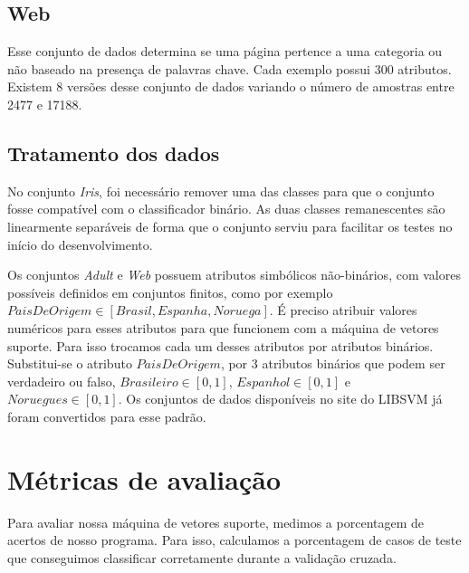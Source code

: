 \subsection{Web} \label{sec:Web}
Esse conjunto de dados determina se uma página pertence a uma categoria ou não baseado na presença de palavras chave. Cada exemplo possui 300 atributos. Existem 8 versões desse conjunto de dados variando o número de amostras entre 2477 e 17188.

\subsection{Tratamento dos dados}
No conjunto {\em Iris}, foi necessário remover uma das classes para que o conjunto fosse compatível com o classificador binário. As duas classes remanescentes são linearmente separáveis de forma que o conjunto serviu para facilitar os testes no início do desenvolvimento.

Os conjuntos \emph{Adult} e \emph{Web} possuem atributos simbólicos não-binários, com valores possíveis definidos em conjuntos finitos, como por exemplo $PaisDeOrigem \in \left [ Brasil,Espanha,Noruega \right ]$. É preciso atribuir valores numéricos para esses atributos para que funcionem com a máquina de vetores suporte. Para isso trocamos cada um desses atributos por atributos binários. Substitui-se o atributo $PaisDeOrigem$, por 3 atributos binários que podem ser verdadeiro ou falso, $Brasileiro \in \left [ 0,1 \right ]$, $Espanhol \in \left [ 0,1 \right ]$ e $Noruegues \in \left [ 0,1 \right ]$. Os conjuntos de dados disponíveis no site do LIBSVM já foram convertidos para esse padrão.

\section{Métricas de avaliação}
Para avaliar nossa máquina de vetores suporte, medimos a porcentagem de acertos de nosso programa. Para isso, calculamos a porcentagem de casos de teste que conseguimos classificar corretamente durante a validação cruzada. 


